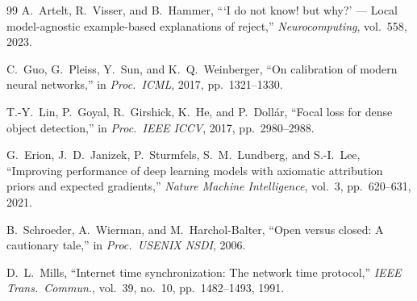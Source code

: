 \documentclass[conference]{IEEEtran}
\begin{document}
\begin{thebibliography}{99}
A.~Artelt, R.~Visser, and B.~Hammer, ```I do not know! but why?' ---
Local model-agnostic example-based explanations of reject,''
\emph{Neurocomputing}, vol.~558, 2023.

C.~Guo, G.~Pleiss, Y.~Sun, and K.~Q.~Weinberger, ``On calibration of modern
neural networks,'' in \emph{Proc.\ ICML}, 2017, pp.~1321--1330.

T.-Y.~Lin, P.~Goyal, R.~Girshick, K.~He, and P.~Doll\'ar, ``Focal loss for
dense object detection,'' in \emph{Proc.\ IEEE ICCV}, 2017, pp.~2980--2988.

G.~Erion, J.~D.~Janizek, P.~Sturmfels, S.~M.~Lundberg, and S.-I.~Lee,
``Improving performance of deep learning models with axiomatic attribution
priors and expected gradients,'' \emph{Nature Machine Intelligence}, vol.~3,
pp.~620--631, 2021.

B.~Schroeder, A.~Wierman, and M.~Harchol-Balter, ``Open versus closed: A
cautionary tale,'' in \emph{Proc.\ USENIX NSDI}, 2006.

D.~L.~Mills, ``Internet time synchronization: The network time protocol,''
\emph{IEEE Trans.\ Commun.}, vol.~39, no.~10, pp.~1482--1493, 1991.

\end{thebibliography}
\end{document}
